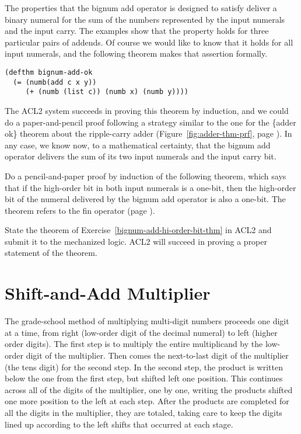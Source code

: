 The properties that the bignum add operator is designed to satisfy
deliver a binary numeral for the sum of
the numbers represented by the input numerals and the input carry.
The examples show that the property holds for three
particular pairs of addends.
Of course we would like to know that it
holds for all input numerals, and
the following theorem makes that assertion formally.

\label{bignum-adder-thm}
\begin{Verbatim}
(defthm bignum-add-ok
  (= (numb(add c x y))
     (+ (numb (list c)) (numb x) (numb y))))
\end{Verbatim}

The ACL2 system succeeds in proving this theorem by induction,
and we could do a paper-and-pencil proof following a strategy
similar to the one for the \{adder ok\} theorem about the ripple-carry adder
(Figure~\ref{fig:adder-thm-prf}, page \pageref{fig:adder-thm-prf}).
In any case, we know now, to a mathematical certainty,
that the bignum add operator delivers
the sum of its two input numerals and the input carry bit.

\begin{ExerciseList}
\Exercise \label{bignum-add-hi-order-bit-thm}
Do a pencil-and-paper proof by induction of the following
theorem, which says that if the high-order bit in both input numerals is a one-bit,
then the high-order bit of the numeral delivered
by the bignum add operator is also a one-bit.
The theorem refers to the fin operator (page \pageref{fin-defun}).

\Exercise State the theorem of Exercise~\ref{bignum-add-hi-order-bit-thm}
in ACL2 and submit it to the mechanized logic.
ACL2 will succeed in proving a proper statement of the theorem.
\end{ExerciseList}

\section{Shift-and-Add Multiplier}
\label{sec:bignum-mult}

The grade-school method of multiplying multi-digit numbers proceeds one digit at a time,
from right (low-order digit of the decimal numeral) to left (higher order digits).
The first step is to multiply the entire multiplicand by the low-order digit
of the multiplier.
Then comes the next-to-last digit of the multiplier (the tens digit) for the second step.
In the second step, the product is written below the one from the first step,
but shifted left one position.
This continues across all of the digits of the multiplier, one by one,
writing the products shifted one more position to the left at each step.
After the products are completed for
all the digits in the multiplier, they are totaled, taking care to keep
the digits lined up according to the left shifts that occurred at each stage.

